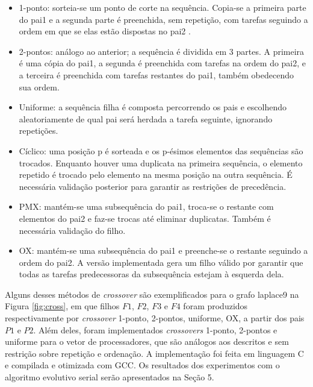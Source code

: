 \documentclass[fleqn,10pt]{SelfArx} %
\begin{document}
\begin{itemize}
\item 1-ponto: sorteia-se um ponto de corte na sequência. Copia-se a primeira parte do pai1 e a segunda parte é preenchida, sem repetição, com tarefas seguindo a ordem em que se elas estão dispostas no pai2 \cite{OMARA201013}.

\item 2-pontos: análogo ao anterior; a sequência é dividida em 3 partes. A primeira é uma cópia do pai1, a segunda é preenchida com tarefas na ordem do pai2, e a terceira é preenchida com tarefas restantes do pai1, também obedecendo sua ordem.

\item Uniforme: a sequência filha é composta percorrendo os pais e escolhendo aleatoriamente de qual pai será herdada a tarefa seguinte, ignorando repetições.

\item Cíclico: uma posição p é sorteada e os p-ésimos elementos das sequências são trocados. Enquanto houver uma duplicata na primeira sequência, o elemento repetido é trocado pelo elemento na mesma posição na outra sequência. É necessária validação posterior para garantir as restrições de precedência.

\item PMX: mantém-se uma subsequência do pai1, troca-se o restante com elementos do pai2 e faz-se trocas até eliminar duplicatas. Também é necessária validação do filho.

\item OX: mantém-se uma subsequência do pai1 e preenche-se o restante seguindo a ordem do pai2. A versão implementada gera um filho válido por garantir que todas as tarefas predecessoras da subsequência estejam à esquerda dela.
\end{itemize}

Alguns desses métodos de \textit{crossover} são exemplificados para o grafo laplace9 na Figura \ref{fig:cross}, em que filhos $F1$, $F2$, $F3$ e $F4$ foram produzidos respectivamente por \textit{crossover} 1-ponto, 2-pontos, uniforme, OX, a partir dos pais $P1$ e $P2$. Além deles, foram implementados \textit{crossovers} 1-ponto, 2-pontos e uniforme para o vetor de processadores, que são análogos aos descritos e sem restrição sobre repetição e ordenação. A implementação foi feita em linguagem C e compilada e otimizada com GCC. Os resultados dos experimentos com o algoritmo evolutivo serial serão apresentados na Seção 5.
\end{document}
